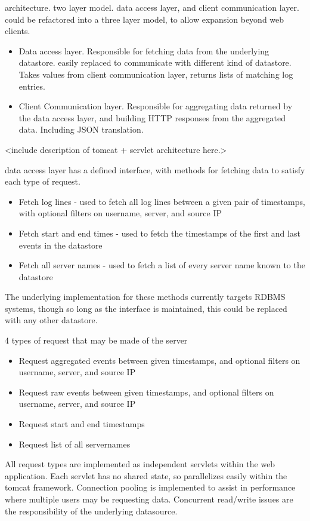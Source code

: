 architecture. two layer model. data access layer, and client communication layer. 
could be refactored into a three layer model, to allow expansion beyond web clients. 
\begin{itemize}
\item{Data access layer. Responsible for fetching data from the underlying datastore. easily replaced to communicate with different kind of datastore. Takes values from client communication layer, returns lists of matching log entries.}
\item{Client Communication layer. Responsible for aggregating data returned by the data access layer, and building HTTP responses from the aggregated data. Including JSON translation.}
\end{itemize}
<include description of tomcat + servlet architecture here.>

data access layer has a defined interface, with methods for fetching data to satisfy each type of request.
\begin{itemize}
\item{Fetch log lines - used to fetch all log lines between a given pair of timestamps, with optional filters on username, server, and source IP}
\item{Fetch start and end times - used to fetch the timestamps of the first and last events in the datastore}
\item{Fetch all server names - used to fetch a list of every server name known to the datastore}
\end{itemize}

The underlying implementation for these methods currently targets RDBMS systems, though so long as the interface is maintained, this could be replaced with any other datastore.

4 types of request that may be made of the server
\begin{itemize}
\item{Request aggregated events between given timestamps, and optional filters on username, server, and source IP}
\item{Request raw events between given timestamps, and optional filters on username, server, and source IP}
\item{Request start and end timestamps}
\item{Request list of all servernames}
\end{itemize}

All request types are implemented as independent servlets within the web application. Each servlet has no shared state, so parallelizes easily within the tomcat framework. Connection pooling is implemented to assist in performance where multiple users may be requesting data. Concurrent read/write issues are the responsibility of the underlying datasource.

